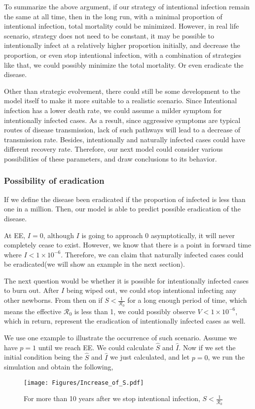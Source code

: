 \documentclass[12pt]{article}
\newcommand{\R}{\mathcal{R}}
\begin{document}
To summarize the above argument, if our strategy of intentional infection remain the same at all time, then in the long run, with a minimal proportion of intentional infection, total mortality could be minimized. However, in real life scenario, strategy does not need to be constant, it may be possible to intentionally infect at a relatively higher proportion initially, and decrease the proportion, or even stop intentional infection, with a combination of strategies like that, we could possibly minimize the total mortality. Or even eradicate the disease.

Other than strategic evolvement, there could still be some development to the model itself to make it more suitable to a realistic scenario. Since Intentional infection has a lower death rate, we could assume a milder symptom for intentionally infected cases. As a result, since aggressive symptoms are typical routes of disease transmission, lack of such pathways will lead to a decrease of transmission rate. Besides, intentionally and naturally infected cases could have different recovery rate. Therefore, our next model could consider various possibilities of these parameters, and draw conclusions to its behavior.

\subsubsection{Possibility of eradication}
If we define the disease been eradicated if the proportion of infected is less than one in a million. Then, our model is able to predict possible eradication of the disease.

At EE, $I=0$, although $I$ is going to approach 0 asymptotically, it will never completely cease to exist. However, we know that there is a point in forward time where $I<1\times10^{-6}$. Therefore, we can claim that naturally infected cases could be eradicated(we will show an example in the next section).

The next question would be whether it is possible for intentionally infected cases to burn out. After $I$ being wiped out, we could stop intentional infecting any other newborns. From then on if $S<\frac{1}{\R_0}$ for a long enough period of time, which means the effective $\R_0$ is less than 1, we could possibly observe $V<1\times10^{-6}$, which in return, represent the eradication of intentionally infected cases as well.

We use one example to illustrate the occurrence of such scenario. Assume we have $p=1$ until we reach EE. We could calculate $\hat{S}$ and $\hat{I}$. Now if we set the initial condition being the $\hat{S}$ and $\hat{I}$ we just calculated, and let $p=0$, we run the simulation and obtain the following,
\begin{figure}[H]
  \centering
  \texttt{[image: Figures/Increase\_of\_S.pdf]}
  \caption{For more than 10 years after we stop intentional infection, $S<\frac{1}{\R_0}$}
\label{figure:S_after_stop}
\end{figure}
\end{document}
